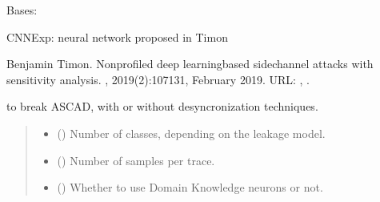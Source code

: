\documentclass[letterpaper,10pt,english]{sphinxmanual}
\begin{document}

\begin{fulllineitems}
\label{\detokenize{MLSCAlib.Architectures:MLSCAlib.Architectures.torch_models.CNNexp}}
\pysigstartsignatures
{}
\pysigstopsignatures
\sphinxAtStartPar
Bases: 

\sphinxAtStartPar
CNNExp: neural network proposed in Timon%
\begin{footnote}[3]\sphinxAtStartFootnote
Benjamin Timon. Non\sphinxhyphen{}profiled deep learning\sphinxhyphen{}based side\sphinxhyphen{}channel attacks with sensitivity analysis. , 2019(2):107\textendash{}131, February 2019. URL: , .
%
\end{footnote} to break ASCAD, with or without desyncronization techniques.
\begin{quote}\begin{description}
\begin{itemize}
\item {} 
\sphinxAtStartPar
{} () \textendash{} Number of classes, depending on the leakage model.

\item {} 
\sphinxAtStartPar
{} () \textendash{} Number of samples per trace.

\item {} 
\sphinxAtStartPar
{} (\sphinxstyleliteralemphasis{\sphinxupquote{, }}) \textendash{} Whether to use Domain Knowledge neurons or not.


\end{itemize}
\end{description}
\end{quote}
\end{fulllineitems}
\end{document}
